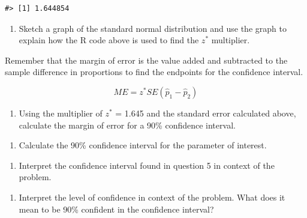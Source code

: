 \documentclass[
]{report}
\providecommand{\tightlist}{%
  \setlength{\itemsep}{0pt}\setlength{\parskip}{0pt}}
\begin{document}
\begin{verbatim}
#> [1] 1.644854
\end{verbatim}

\newpage

\begin{enumerate}
\def\labelenumi{\arabic{enumi}.}
\setcounter{enumi}{2}
\tightlist
\item
  Sketch a graph of the standard normal distribution and use the graph to explain how the R code above is used to find the \(z^*\) multiplier.
\end{enumerate}

\vspace{1.5in}

Remember that the margin of error is the value added and subtracted to the sample difference in proportions to find the endpoints for the confidence interval.

\[ME = z^*SE(\hat{p}_1 - \hat{p}_2)\]

\begin{enumerate}
\def\labelenumi{\arabic{enumi}.}
\setcounter{enumi}{3}
\tightlist
\item
  Using the multiplier of \(z^*\) = 1.645 and the standard error calculated above, calculate the margin of error for a 90\% confidence interval.
\end{enumerate}

\vspace{0.5in}

\begin{enumerate}
\def\labelenumi{\arabic{enumi}.}
\setcounter{enumi}{4}
\tightlist
\item
  Calculate the 90\% confidence interval for the parameter of interest.
\end{enumerate}

\vspace{0.8in}

\begin{enumerate}
\def\labelenumi{\arabic{enumi}.}
\setcounter{enumi}{5}
\tightlist
\item
  Interpret the confidence interval found in question 5 in context of the problem.
\end{enumerate}

\vspace{0.8in}

\begin{enumerate}
\def\labelenumi{\arabic{enumi}.}
\setcounter{enumi}{6}
\tightlist
\item
  Interpret the level of confidence in context of the problem. What does it mean to be 90\% confident in the confidence interval?
\end{enumerate}
\end{document}
